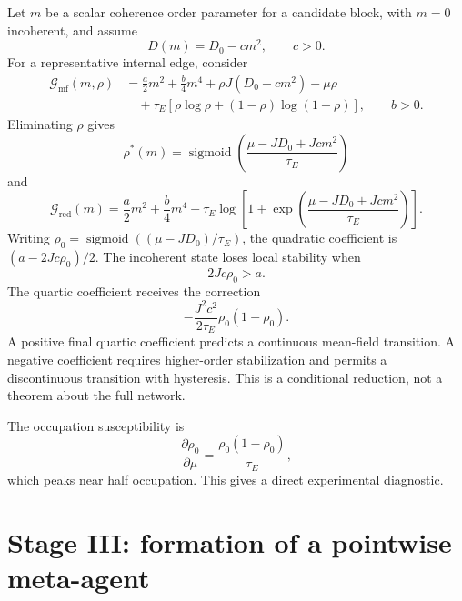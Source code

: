 \documentclass[11pt,letterpaper]{article}
\newcommand{\cG}{\mathcal G}
\newcommand{\sigmoid}{\operatorname{sigmoid}}
\begin{document}
Let $m$ be a scalar coherence order parameter for a candidate block, with $m=0$ incoherent, and assume
\begin{equation}
 D(m)=D_0-cm^2,
 \qquad c>0.
 \label{eq:mismatch-order-parameter}
\end{equation}
For a representative internal edge, consider
\begin{align}
 \cG_{\mathrm{mf}}(m,\rho)
 &=\frac{a}{2}m^2+\frac{b}{4}m^4
 +\rho J(D_0-cm^2)-\mu\rho
 \nonumber\\
 &\quad+\tau_E\left[\rho\log\rho+(1-\rho)\log(1-\rho)\right],
 \qquad b>0.
 \label{eq:mean-field-grand-potential}
\end{align}
Eliminating $\rho$ gives
\begin{equation}
 \rho^*(m)=\sigmoid\left(\frac{\mu-JD_0+Jcm^2}{\tau_E}\right)
 \label{eq:mean-field-occupation}
\end{equation}
and
\begin{equation}
 \cG_{\mathrm{red}}(m)
 =\frac{a}{2}m^2+\frac{b}{4}m^4
 -\tau_E\log\left[1+\exp\left(\frac{\mu-JD_0+Jcm^2}{\tau_E}\right)\right].
 \label{eq:mean-field-reduced}
\end{equation}
Writing $\rho_0=\sigmoid((\mu-JD_0)/\tau_E)$, the quadratic coefficient is $(a-2Jc\rho_0)/2$.  The incoherent state loses local stability when
\begin{equation}
 \boxed{2Jc\rho_0>a.}
 \label{eq:coherence-instability}
\end{equation}
The quartic coefficient receives the correction
\begin{equation}
 -\frac{J^2c^2}{2\tau_E}\rho_0(1-\rho_0).
 \label{eq:quartic-correction}
\end{equation}
A positive final quartic coefficient predicts a continuous mean-field transition.  A negative coefficient requires higher-order stabilization and permits a discontinuous transition with hysteresis.  This is a conditional reduction, not a theorem about the full network.

The occupation susceptibility is
\begin{equation}
 \frac{\partial\rho_0}{\partial\mu}
 =\frac{\rho_0(1-\rho_0)}{\tau_E},
 \label{eq:edge-susceptibility}
\end{equation}
which peaks near half occupation.  This gives a direct experimental diagnostic.

\section{Stage III: formation of a pointwise meta-agent}
\end{document}
